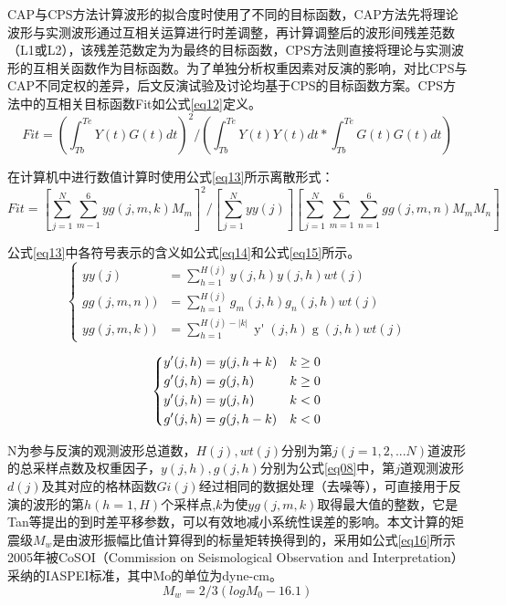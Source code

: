 CAP与CPS方法计算波形的拟合度时使用了不同的目标函数，CAP方法先将理论波形与实测波形通过互相关运算进行时差调整，再计算调整后的波形间残差范数（L1或L2）\citep{Zhao1994}，该残差范数定为为最终的目标函数，CPS方法则直接将理论与实测波形的互相关函数作为目标函数。为了单独分析权重因素对反演的影响，对比CPS与CAP不同定权的差异，后文反演试验及讨论均基于CPS的目标函数方案。CPS方法中的互相关目标函数Fit如公式\ref{eq12}定义。
\begin{equation}
\label{eq12}
Fit=(\int_{Tb}^{Te}Y(t)G(t)dt)^2/(\int_{Tb}^{Te}Y(t)Y(t)dt*\int_{Tb}^{Te}G(t)G(t)dt)
\end{equation}

在计算机中进行数值计算时使用公式\ref{eq13}所示离散形式：
\begin{equation}
\label{eq13}
Fit=[\sum_{j=1}^{N}\sum_{m-1}^{6}yg(j,m,k)M_m]^2/{[\sum_{j=1}^{N}yy(j)][\sum_{j=1}^{N}\sum_{m=1}^{6}\sum_{n=1}^{6}gg(j,m,n)M_mM_n]}
\end{equation}

公式\ref{eq13}中各符号表示的含义如公式\ref{eq14}和公式\ref{eq15}所示。
\begin{equation}
\label{eq14}
\left\{
    \begin{aligned}
    yy(j)&=\sum_{h=1}^{H(j)}y(j,h)y(j,h)wt(j)\\
    gg(j,m,n))&=\sum_{h=1}^{H(j)}g_{m}(j,h)g_{n}(j,h)wt(j)\\
    yg(j,m,k))&=\sum_{h=1}^{H(j)-|k|}\mathop{{y}'}(j,h)\mathop{{g}'_{m}}(j,h)wt(j)
    \end{aligned}
\right.
\end{equation}

\begin{equation}
\label{eq15}
\left\{
    \begin{aligned}
    \mathop{{y}'}(j,h)&=y(j,h+k) &k\geq0 \\
    \mathop{{g}'}(j,h)&=g(j,h)   &k\geq0 \\
    \mathop{{y}'}(j,h)&=y(j,h)   &k<0 \\
    \mathop{{g}'}(j,h)&=g(j,h-k) &k<0 \\
    \end{aligned}   \\
\right.
\end{equation}

N为参与反演的观测波形总道数，$H(j),wt(j)$分别为第$j(j=1,2,...N)$道波形的总采样点数及权重因子，$y(j,h),g(j,h)$分别为公式\ref{eq08}中，第$j$道观测波形$d(j)$及其对应的格林函数$Gi(j)$经过相同的数据处理（去噪等），可直接用于反演的波形的第$h(h=1,H)$个采样点,$k$为使$yg(j,m,k)$取得最大值的整数，它是Tan等\citep{Tan2006}提出的到时差平移参数，可以有效地减小系统性误差的影响。本文计算的矩震级$M_w$是由波形振幅比值计算得到的标量矩转换得到的，采用如公式\ref{eq16}所示2005年被CoSOI（Commission on Seismological Observation and Interpretation）采纳的IASPEI标准，其中Mo的单位为dyne-cm。
\begin{equation}
\label{eq16}
	M_w=2/3(logM_0-16.1)
\end{equation}

